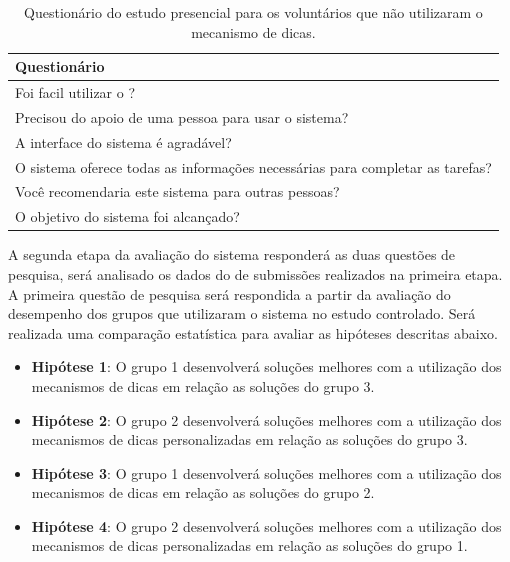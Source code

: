 \begin{table}[]
	\centering
	\captionsetup{justification=centering}
	\caption{Questionário do estudo presencial para os voluntários que não utilizaram o mecanismo de dicas.}
	\label{tabela:questionárioestudosemdica}
	\begin{tabular}{l}
		\hline
		Questionário                        											\\ \hline
		Foi facil utilizar o \foreign{iHint}?                            				\\
		Precisou do apoio de uma pessoa para usar o sistema?                           	\\
		A interface do sistema é agradável?                        						\\
		O sistema oferece todas as informações necessárias para completar as tarefas?   \\
		Você recomendaria este sistema para outras pessoas?                           	\\
		O objetivo do sistema foi alcançado? 											\\ \hline
	\end{tabular}
\end{table}

A segunda etapa da avaliação do sistema responderá as duas questões de pesquisa, será analisado os dados do  de submissões realizados na primeira etapa. A primeira questão de pesquisa será respondida a partir da avaliação do desempenho dos grupos que utilizaram o sistema no estudo controlado. Será realizada uma comparação estatística para avaliar as hipóteses descritas abaixo. 

\begin{itemize}
	\item \textbf{Hipótese 1}: O grupo 1 desenvolverá soluções melhores com a utilização dos mecanismos de dicas em relação as soluções do grupo 3.
	\item \textbf{Hipótese 2}: O grupo 2 desenvolverá soluções melhores com a utilização dos mecanismos de dicas personalizadas em relação as soluções do grupo 3.	
	\item \textbf{Hipótese 3}: O grupo 1 desenvolverá soluções melhores com a utilização dos mecanismos de dicas em relação as soluções do grupo 2.	
	\item \textbf{Hipótese 4}: O grupo 2 desenvolverá soluções melhores com a utilização dos mecanismos de dicas personalizadas em relação as soluções do grupo 1.
\end{itemize}


